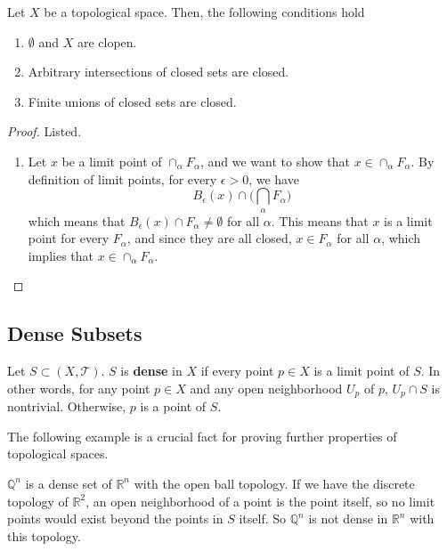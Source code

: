   \begin{theorem}
    Let $X$ be a topological space. Then, the following conditions hold
    \begin{enumerate}
      \item $\emptyset$ and $X$ are clopen.
      \item Arbitrary intersections of closed sets are closed. 
      \item Finite unions of closed sets are closed. 
    \end{enumerate}
  \end{theorem}
  \begin{proof}
    Listed. 
    \begin{enumerate}
      \item Let $x$ be a limit point of $\cap_\alpha F_\alpha$, and we want to show that $x \in \cap_\alpha F_\alpha$. By definition of limit points, for every $\epsilon > 0$, we have 
      \begin{equation}
        B_\epsilon (x) \cap \bigg( \bigcap_\alpha F_\alpha \bigg)
      \end{equation}
      which means that $B_\epsilon (x) \cap F_\alpha \neq \emptyset$ for all $\alpha$. This means that $x$ is a limit point for every $F_\alpha$, and since they are all closed, $x \in F_\alpha$ for all $\alpha$, which implies that $x \in \cap_\alpha F_\alpha$. 
    \end{enumerate}
  \end{proof}

\subsection{Dense Subsets}

  \begin{definition}
    Let $S \subset (X, \mathscr{T})$. $S$ is \textbf{dense} in $X$ if every point $p \in X$ is a limit point of $S$. In other words, for any point $p \in X$ and any open neighborhood $U_p$ of $p$, $U_p \cap S$ is nontrivial. Otherwise, $p$ is a point of $S$. 
  \end{definition}

  The following example is a crucial fact for proving further properties of topological spaces. 

  \begin{example}
    $\mathbb{Q}^{n}$ is a dense set of $\mathbb{R}^{n}$ with the open ball topology. If we have the discrete topology of $\mathbb{R}^{2}$, an open neighborhood of a point is the point itself, so no limit points would exist beyond the points in $S$ itself. So $\mathbb{Q}^{n}$ is not dense in $\mathbb{R}^{n}$ with this topology. 
  \end{example}

